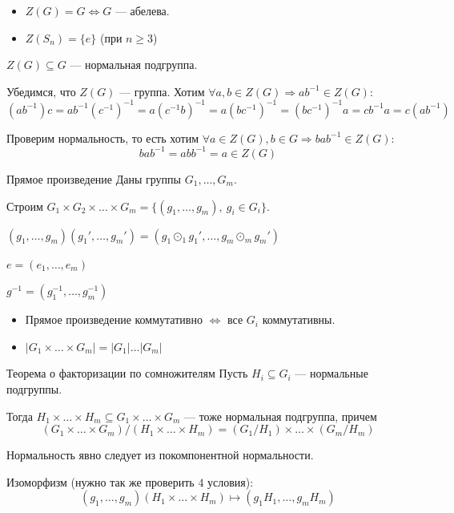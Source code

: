\begin{example}{}{}
    \begin{itemize}
        \item
            \( Z(G) = G \Leftrightarrow G \) --- абелева.
        \item
            \( Z(S_n) = \{ e \} \) (при \( n \geq 3 \))
    \end{itemize}
\end{example}

\begin{prop}{}{}
    \( Z(G) \subseteq G \) --- нормальная подгруппа.
\end{prop}

Убедимся, что \( Z(G) \) --- группа.
Хотим \( \forall a, b \in Z(G) \Rightarrow a b^{-1} \in Z(G) \):
\[
    (a b^{-1}) c
    =
    a b^{-1} (c^{-1})^{-1}
    =
    a (c^{-1} b)^{-1}
    =
    a (b c^{-1})^{-1}
    =
    (b c^{-1})^{-1} a
    =
    c b^{-1} a
    =
    c (a b^{-1})
\]

Проверим нормальность, то есть хотим \( \forall a \in Z(G), b \in G \Rightarrow b a b^{-1} \in Z(G) \):
\[
    b a b^{-1} = a b b^{-1} = a \in Z(G)
\]

\begin{defn}{Прямое произведение}{}
    Даны группы \( G_1, \ldots, G_m \).

    Строим \( G_1 \times G_2 \times \ldots \times G_m = \{ (g_1, \ldots, g_m), \: g_i \in G_i \} \).

    \( (g_1, \ldots, g_m) (g_1', \ldots, g_m') = (g_1 \odot_1 g_1', \ldots, g_m \odot_m g_m') \)

    \( e = (e_1, \ldots, e_m) \)

    \( g^{-1} = (g_1^{-1}, \ldots, g_m^{-1}) \)
\end{defn}

\begin{remark}{}{}
    \begin{itemize}
        \item
            Прямое произведение коммутативно \( \Leftrightarrow \) все \( G_i \) коммутативны.
        \item
            \( |G_1 \times \ldots \times G_m| = |G_1| \ldots |G_m| \)
    \end{itemize}
\end{remark}

\begin{thrm}{Теорема о факторизации по сомножителям}{}
    Пусть \( H_i \subseteq G_i \) --- нормальные подгруппы.

    Тогда \( H_1 \times \ldots \times H_m \subseteq G_1 \times \ldots \times G_m \)
    --- тоже нормальная подгруппа, причем
    \[
        (G_1 \times \ldots \times G_m) / (H_1 \times \ldots \times H_m)
        =
        (G_1 / H_1) \times \ldots \times (G_m / H_m)
    \]
\end{thrm}

Нормальность явно следует из покомпонентной нормальности.

Изоморфизм (нужно так же проверить \( 4 \) условия):
\[
    (g_1, \ldots, g_m) (H_1 \times \ldots \times H_m) \mapsto (g_1 H_1, \ldots, g_m H_m)
\]
